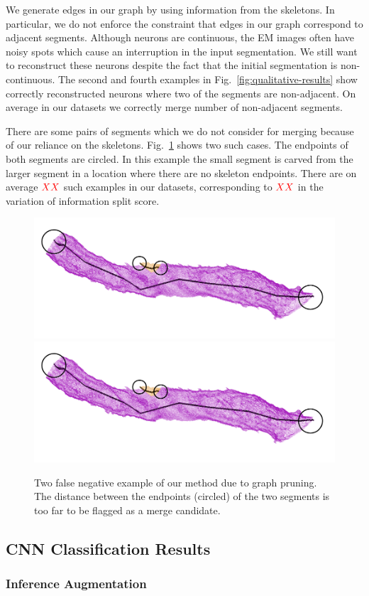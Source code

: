 We generate edges in our graph by using information from the skeletons. 
In particular, we do not enforce the constraint that edges in our graph correspond to adjacent segments.
Although neurons are continuous, the EM images often have noisy spots which cause an interruption in the input segmentation.
We still want to reconstruct these neurons despite the fact that the initial segmentation is non-continuous. 
The second and fourth examples in Fig.~\ref{fig:qualitative-results} show correctly reconstructed neurons where two of the segments are non-adjacent. 
On average in our datasets we correctly merge  number of non-adjacent segments. 

There are some pairs of segments which we do not consider for merging because of our reliance on the skeletons.
Fig.~\ref{fig:skeleton-results} shows two such cases. 
The endpoints of both segments are circled.
In this example the small segment is carved from the larger segment in a location where there are no skeleton endpoints. 
There are on average $\textcolor{red}{XX}$ such examples in our datasets, corresponding to $\textcolor{red}{XX}$ in the variation of information split score. 

\begin{figure}[t!]
	\centering
	\includegraphics[width=0.45\linewidth]{./figures/merge_candidate1.png}		\includegraphics[width=0.45\linewidth]{./figures/merge_candidate1.png}
	\caption{Two false negative example of our method due to graph pruning. The distance between the endpoints (circled) of the two segments is too far to be flagged as a merge candidate. }
	\label{fig:skeleton-results}
\end{figure}

\subsection{CNN Classification Results}

\subsubsection{Inference Augmentation}

